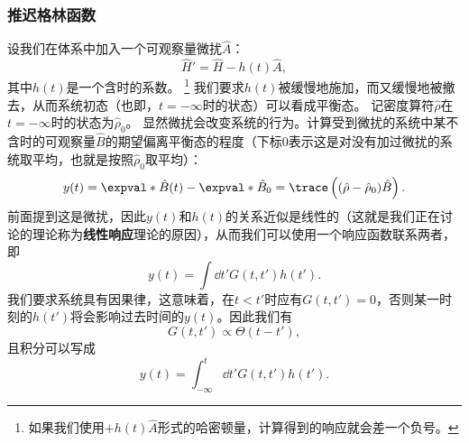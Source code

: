 \subsubsection{推迟格林函数}

设我们在体系中加入一个可观察量微扰$\hat{A}$：
\begin{equation}
    \hat{H}' = \hat{H} - h(t) \hat{A},
\end{equation}
其中$h(t)$是一个含时的系数。%
\footnote{如果我们使用$+ h(t) \hat{A}$形式的哈密顿量，计算得到的响应就会差一个负号。}%
我们要求$h(t)$被缓慢地施加，而又缓慢地被撤去，从而系统初态（也即，$t=-\infty$时的状态）可以看成平衡态。
记密度算符$\hat{\rho}$在$t=-\infty$时的状态为$\hat{\rho}_0$。
显然微扰会改变系统的行为。计算受到微扰的系统中某不含时的可观察量$\hat{B}$的期望偏离平衡态的程度（下标0表示这是对没有加过微扰的系统取平均，也就是按照$\hat{\rho}_0$取平均）：
\[
    y(t) = \expval*{\hat{B}}(t) - \expval*{\hat{B}}_0 = \trace\left((\hat{\rho} - \hat{\rho}_0)\hat{B}\right).
\]
前面提到这是微扰，因此$y(t)$和$h(t)$的关系近似是线性的（这就是我们正在讨论的理论称为\textbf{线性响应}理论的原因），从而我们可以使用一个响应函数联系两者，即
\[
    y(t) = \int \dd{t'} G(t, t') h(t').
\]
我们要求系统具有因果律，这意味着，在$t<t'$时应有$G(t,t')=0$，否则某一时刻的$h(t')$将会影响过去时间的$y(t)$。因此我们有
\[
    G(t,t') \propto \Theta(t-t'),
\]
且积分可以写成
\[
    y(t) = \int_{-\infty}^t \dd{t'} G(t, t') h(t').
\]

